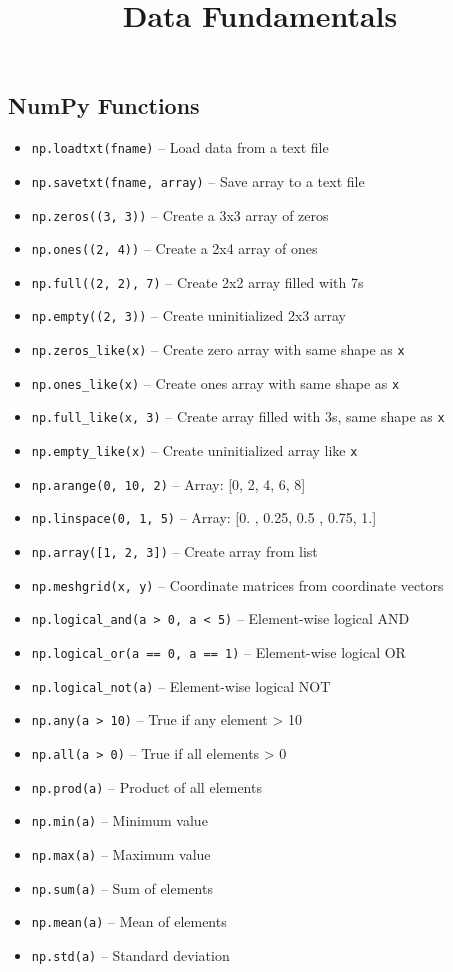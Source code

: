 \documentclass{article}
\title{Data Fundamentals}
\author{}
\date{}
\begin{document}
\small

\subsection*{NumPy Functions}
\begin{itemize}
    \item \texttt{np.loadtxt(fname)} -- Load data from a text file
    \item \texttt{np.savetxt(fname, array)} -- Save array to a text file
    \item \texttt{np.zeros((3, 3))} -- Create a 3x3 array of zeros
    \item \texttt{np.ones((2, 4))} -- Create a 2x4 array of ones
    \item \texttt{np.full((2, 2), 7)} -- Create 2x2 array filled with 7s
    \item \texttt{np.empty((2, 3))} -- Create uninitialized 2x3 array
    \item \texttt{np.zeros\_like(x)} -- Create zero array with same shape as \texttt{x}
    \item \texttt{np.ones\_like(x)} -- Create ones array with same shape as \texttt{x}
    \item \texttt{np.full\_like(x, 3)} -- Create array filled with 3s, same shape as \texttt{x}
    \item \texttt{np.empty\_like(x)} -- Create uninitialized array like \texttt{x}
    \item \texttt{np.arange(0, 10, 2)} -- Array: [0, 2, 4, 6, 8]
    \item \texttt{np.linspace(0, 1, 5)} -- Array: [0. , 0.25, 0.5 , 0.75, 1.]
    \item \texttt{np.array([1, 2, 3])} -- Create array from list
    \item \texttt{np.meshgrid(x, y)} -- Coordinate matrices from coordinate vectors

    \item \texttt{np.logical\_and(a > 0, a < 5)} -- Element-wise logical AND
    \item \texttt{np.logical\_or(a == 0, a == 1)} -- Element-wise logical OR
    \item \texttt{np.logical\_not(a)} -- Element-wise logical NOT

    \item \texttt{np.any(a > 10)} -- True if any element > 10
    \item \texttt{np.all(a > 0)} -- True if all elements > 0
    \item \texttt{np.prod(a)} -- Product of all elements
    \item \texttt{np.min(a)} -- Minimum value
    \item \texttt{np.max(a)} -- Maximum value
    \item \texttt{np.sum(a)} -- Sum of elements
    \item \texttt{np.mean(a)} -- Mean of elements
    \item \texttt{np.std(a)} -- Standard deviation


\end{itemize}
\end{document}
